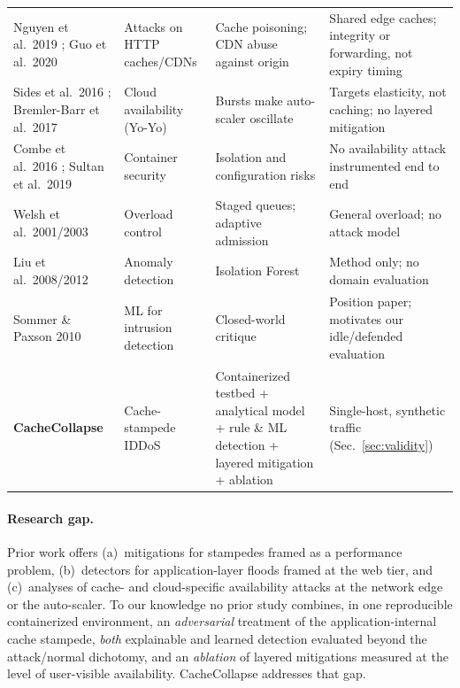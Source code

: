 \documentclass[preprint,12pt]{elsarticle}
\begin{document}
\begin{table}[p]
\begin{tabularx}{\linewidth}{@{}L{2.7cm}L{2.6cm}YY@{}}
Nguyen et al.\ 2019 \cite{nguyen2019}; Guo et al.\ 2020 \cite{guo2020} & Attacks on HTTP caches/CDNs & Cache poisoning; CDN abuse against origin & Shared edge caches; integrity or forwarding, not expiry timing \\
Sides et al.\ 2016 \cite{sides2016}; Bremler-Barr et al.\ 2017 \cite{bremlerbarr2017} & Cloud availability (Yo-Yo) & Bursts make auto-scaler oscillate & Targets elasticity, not caching; no layered mitigation \\
Combe et al.\ 2016 \cite{combe2016}; Sultan et al.\ 2019 \cite{sultan2019} & Container security & Isolation and configuration risks & No availability attack instrumented end to end \\
Welsh et al.\ 2001/2003 \cite{welsh2001,welsh2003} & Overload control & Staged queues; adaptive admission & General overload; no attack model \\
Liu et al.\ 2008/2012 \cite{liu2008,liu2012} & Anomaly detection & Isolation Forest & Method only; no domain evaluation \\
Sommer \& Paxson 2010 \cite{sommer2010} & ML for intrusion detection & Closed-world critique & Position paper; motivates our idle/defended evaluation \\
\midrule
\textbf{CacheCollapse} & Cache-stampede IDDoS & Containerized testbed + analytical model + rule \& ML detection + layered mitigation + ablation & Single-host, synthetic traffic (Sec.~\ref{sec:validity}) \\
\bottomrule
\end{tabularx}
\end{table}

\paragraph{Research gap.} Prior work offers (a)~mitigations for stampedes framed as a
performance problem, (b)~detectors for application-layer floods framed at the web
tier, and (c)~analyses of cache- and cloud-specific availability attacks at the network
edge or the auto-scaler. To our knowledge no prior study combines, in one reproducible
containerized environment, an \emph{adversarial} treatment of the application-internal
cache stampede, \emph{both} explainable and learned detection evaluated beyond the
attack/normal dichotomy, and an \emph{ablation} of layered mitigations measured at the
level of user-visible availability. CacheCollapse addresses that gap.

\end{document}
